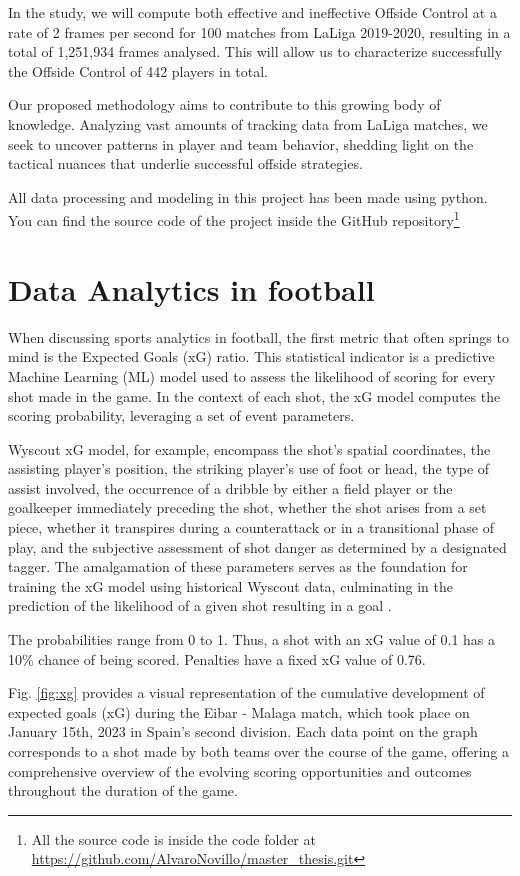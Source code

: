 \documentclass[
  twoside,nohyper]{book}
\begin{document}
In the study, we will compute both effective and ineffective Offside Control at a rate of 2 frames per second for 100 matches from LaLiga 2019-2020, resulting in a total of 1,251,934 frames analysed. This will allow us to characterize successfully the Offside Control of 442 players in total.

Our proposed methodology aims to contribute to this growing body of knowledge. Analyzing vast amounts of tracking data from LaLiga matches, we seek to uncover patterns in player and team behavior, shedding light on the tactical nuances that underlie successful offside strategies.

All data processing and modeling in this project has been made using python. You can find the source code of the project inside the GitHub repository\footnote{All the source code is inside the code folder at \url{https://github.com/AlvaroNovillo/master_thesis.git}}

\chapter{Data Analytics in football}\label{data-analytics-in-football}

When discussing sports analytics in football, the first metric that
often springs to mind is the Expected Goals (xG) ratio. This statistical
indicator is a predictive Machine Learning (ML) model used to assess the
likelihood of scoring for every shot made in the game. In the context of
each shot, the xG model computes the scoring probability, leveraging a
set of event parameters.

Wyscout xG model, for example, encompass the shot's spatial coordinates,
the assisting player's position, the striking player's use of foot or
head, the type of assist involved, the occurrence of a dribble by either
a field player or the goalkeeper immediately preceding the shot, whether
the shot arises from a set piece, whether it transpires during a
counterattack or in a transitional phase of play, and the subjective
assessment of shot danger as determined by a designated tagger. The
amalgamation of these parameters serves as the foundation for training
the xG model using historical Wyscout data, culminating in the
prediction of the likelihood of a given shot resulting in a goal
\citep{wyscout}.

The probabilities range from 0 to 1. Thus, a shot with an xG value of
0.1 has a 10\% chance of being scored. Penalties have a fixed xG value of
0.76.

Fig. \ref{fig:xg} provides a visual representation of the cumulative development of expected goals
(xG) during the Eibar - Malaga match, which took place on January 15th,
2023 in Spain's second division. Each data point on the graph
corresponds to a shot made by both teams over the course of the game,
offering a comprehensive overview of the evolving scoring opportunities
and outcomes throughout the duration of the game.
\end{document}
